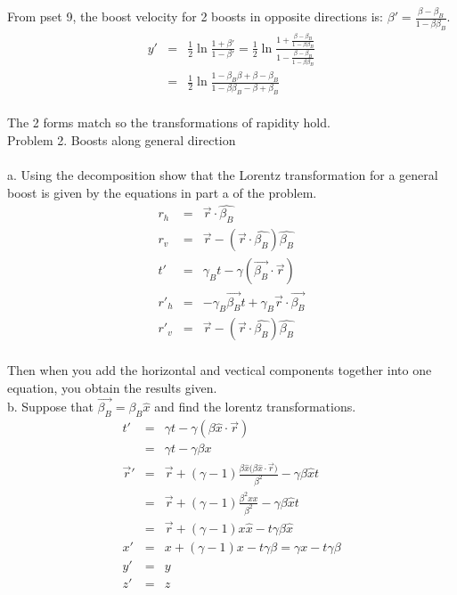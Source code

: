 \documentclass[11pt]{amsart}
\begin{document}
From pset 9, the boost velocity for 2 boosts in opposite directions is: $\beta'=\frac{\beta-\beta_{B}}{1-\beta\beta_{B}}$. \\
\begin{eqnarray*} 
y' &=& \frac{1}{2}\ln{\frac{1+\beta'}{1-\beta'}} = \frac{1}{2}\ln{\frac{1+\frac{\beta-\beta_{B}}{1-\beta\beta_{B}}}{1-\frac{\beta-\beta_{B}}{1-\beta\beta_{B}}}} \\
&=& \frac{1}{2}\ln{\frac{1-\beta_{B}\beta+\beta-\beta_{B}}{1-\beta\beta_{B}-\beta+\beta_{B}}}  
\end{eqnarray*} \\
The 2 forms match so the transformations of rapidity hold. \\


Problem 2. Boosts along general direction \\ \\
a. Using the decomposition show that the Lorentz transformation for a general boost is given by the equations in part a of the problem. \\
\begin{eqnarray*}
r_{h} &=& \vec{r}\cdot{\hat{\beta_{B}}} \\
r_{v} &=& \vec{r}-(\vec{r}\cdot{\hat{\beta_{B}}}) \hat{\beta_{B}} \\
t' &=& \gamma_{B}t-\gamma(\vec{\beta_{B}}\cdot{\vec{r}}) \\
r'_{h} &=& -\gamma_{B}\vec{\beta_{B}}t+\gamma_{B}\vec{r}\cdot{\vec{\beta_{B}}} \\
r'_{v} &=& \vec{r}-(\vec{r}\cdot{\hat{\beta_{B}}} )\hat{\beta_{B}} 
\end{eqnarray*} \\
Then when you add the horizontal and vectical components together into one equation, you obtain the results given. \\
b. Suppose that $\vec{\beta_{B}}=\beta_{B}\hat{x}$ and find the lorentz transformations. \\
\begin{eqnarray*}
t' &=& \gamma{t}-\gamma(\beta\hat{x}\cdot{\vec{r}})\\
&=& \gamma{t}-\gamma\beta{x} \\
\vec{r}' &=& \vec{r}+(\gamma-1)\frac{\beta\hat{x}(\beta\hat{x}\cdot{\vec{r})}}{\beta^{2}}-\gamma\beta\hat{x}t \\
&=& \vec{r}+(\gamma-1)\frac{\beta^{2}\hat{x}x}{\beta^{2}}-\gamma\beta\hat{x}t \\
&=& \vec{r}+(\gamma-1)x\hat{x}-t\gamma\beta\hat{x} \\
x' &=& x+(\gamma-1)x-t\gamma\beta = \gamma{x}-t\gamma\beta \\
y' &=& y \\
z' &=& z 
\end{eqnarray*} \\
\end{document}

